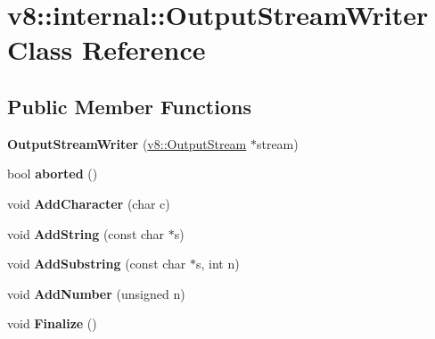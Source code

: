 \hypertarget{classv8_1_1internal_1_1_output_stream_writer}{}\section{v8\+:\+:internal\+:\+:Output\+Stream\+Writer Class Reference}
\label{classv8_1_1internal_1_1_output_stream_writer}
\subsection*{Public Member Functions}
\begin{DoxyCompactItemize}
\item 
{\bfseries Output\+Stream\+Writer} (\hyperlink{classv8_1_1_output_stream}{v8\+::\+Output\+Stream} $\ast$stream)\hypertarget{classv8_1_1internal_1_1_output_stream_writer_af20c1920eef3070065347358f0a52bfb}{}\label{classv8_1_1internal_1_1_output_stream_writer_af20c1920eef3070065347358f0a52bfb}

\item 
bool {\bfseries aborted} ()\hypertarget{classv8_1_1internal_1_1_output_stream_writer_a786eee01911e2c412d67422a8fe86265}{}\label{classv8_1_1internal_1_1_output_stream_writer_a786eee01911e2c412d67422a8fe86265}

\item 
void {\bfseries Add\+Character} (char c)\hypertarget{classv8_1_1internal_1_1_output_stream_writer_abe84a4a8672b458c1eda763295bba60e}{}\label{classv8_1_1internal_1_1_output_stream_writer_abe84a4a8672b458c1eda763295bba60e}

\item 
void {\bfseries Add\+String} (const char $\ast$s)\hypertarget{classv8_1_1internal_1_1_output_stream_writer_a2b4529a2584f920315a66814489eb214}{}\label{classv8_1_1internal_1_1_output_stream_writer_a2b4529a2584f920315a66814489eb214}

\item 
void {\bfseries Add\+Substring} (const char $\ast$s, int n)\hypertarget{classv8_1_1internal_1_1_output_stream_writer_a2626cd836862fffbbfac9f9e3542a357}{}\label{classv8_1_1internal_1_1_output_stream_writer_a2626cd836862fffbbfac9f9e3542a357}

\item 
void {\bfseries Add\+Number} (unsigned n)\hypertarget{classv8_1_1internal_1_1_output_stream_writer_a35497ea28ddc99160026a0c28d49e160}{}\label{classv8_1_1internal_1_1_output_stream_writer_a35497ea28ddc99160026a0c28d49e160}

\item 
void {\bfseries Finalize} ()\hypertarget{classv8_1_1internal_1_1_output_stream_writer_af1025ba7918a92345913bec1ba5a0bce}{}\label{classv8_1_1internal_1_1_output_stream_writer_af1025ba7918a92345913bec1ba5a0bce}

\end{DoxyCompactItemize}
